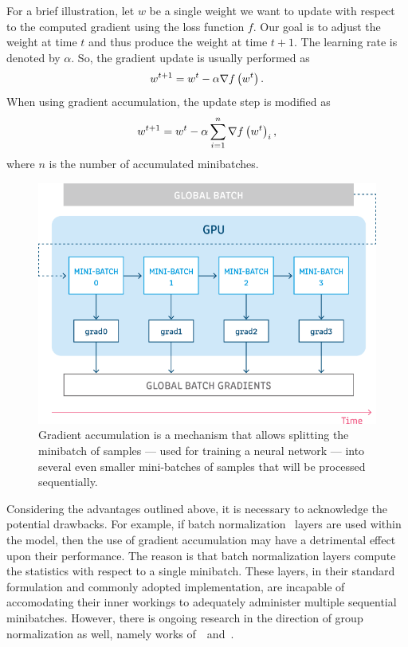 For a brief illustration, let $w$ be a single weight we want to update with respect to the computed gradient using the loss function $f$. Our goal is to adjust the weight at time $t$ and thus produce the weight at time $t + 1$. The learning rate is denoted by $\alpha$. So, the gradient update is usually performed as
\begin{equation}
    w^{t + 1} = w^t - \alpha \nabla {f} \left( w^t \right).
\end{equation}
When using gradient accumulation, the update step is modified as
\begin{equation}
    w^{t + 1} = w^t - \alpha \sum_{i = 1}^{n} \nabla {f} \left( w^t \right)_i,
\end{equation}
where $n$ is the number of accumulated minibatches.

\begin{figure}[!t]
    \centering
    \includegraphics[width=0.6\linewidth]{figures/siamese_tracking/gradient_accumulation.png}
    \caption[Gradient accumulation]{Gradient accumulation is a mechanism that allows splitting the minibatch of samples — used for training a neural network — into several even smaller mini-batches of samples that will be processed sequentially. }
    \label{fig:GradientAccumulation}
\end{figure}

Considering the advantages outlined above, it is necessary to acknowledge the potential drawbacks. For example, if batch normalization~\cite{ioffe2015batchnorm} layers are used within the model, then the use of gradient accumulation may have a detrimental effect upon their performance. The reason is that batch normalization layers compute the statistics with respect to a single minibatch. These layers, in their standard formulation and commonly adopted implementation, are incapable of accomodating their inner workings to adequately administer multiple sequential minibatches. However, there is ongoing research in the direction of group normalization as well, namely works of~\cite{wu2018groupnorm}~and~\cite{zhou2020batchgroupnorm}.
